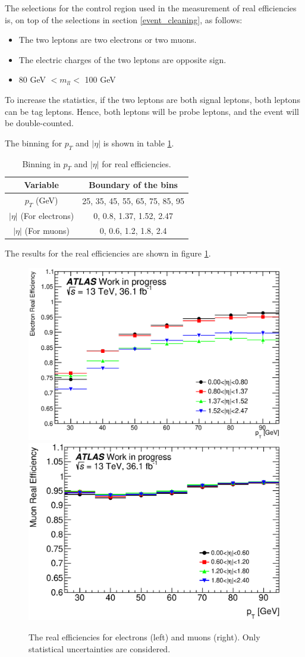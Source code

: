 The selections for the control region used in the measurement of real efficiencies is, on top of the selections in section \ref{event_cleaning}, as follows:
\begin{itemize}
\item The two leptons are two electrons or two muons.
\item The electric charges of the two leptons are opposite sign.
\item 80 GeV $< m_{ll} <$ 100 GeV
\end{itemize}

To increase the statistics, if the two leptons are both signal leptons, both leptons can be tag leptons.
Hence, both leptons will be probe leptons, and the event will be double-counted.

The binning for $p_T$ and $|\eta|$ is shown in table \ref{tab:binning_real_eff}.
\begin{table}[htbp]
\centering
\begin{tabular}{|c|c|}
\hline
Variable & Boundary of the bins \\
\hline
$p_T$ (GeV) &  25, 35, 45, 55, 65, 75, 85, 95 \\
\hline
$|\eta|$ (For electrons) & 0, 0.8, 1.37, 1.52, 2.47 \\
\hline
$|\eta|$ (For muons) & 0, 0.6, 1.2, 1.8, 2.4 \\
\hline
\end{tabular}
\caption{Binning in $p_T$ and $|\eta|$ for real efficiencies.}
\label{tab:binning_real_eff}
\end{table}

The results for the real efficiencies are shown in figure \ref{fig:result_real_eff}.
\begin{figure}[htpb]
\centering
\includegraphics[width=0.49\linewidth]{data/plot/plotRealEffs/El_hEff.eps}
\includegraphics[width=0.49\linewidth]{data/plot/plotRealEffs/Mu_hEff.eps}
\caption{The real efficiencies for electrons (left) and muons (right). Only statistical uncertainties are considered.}
\label{fig:result_real_eff}
\end{figure}

